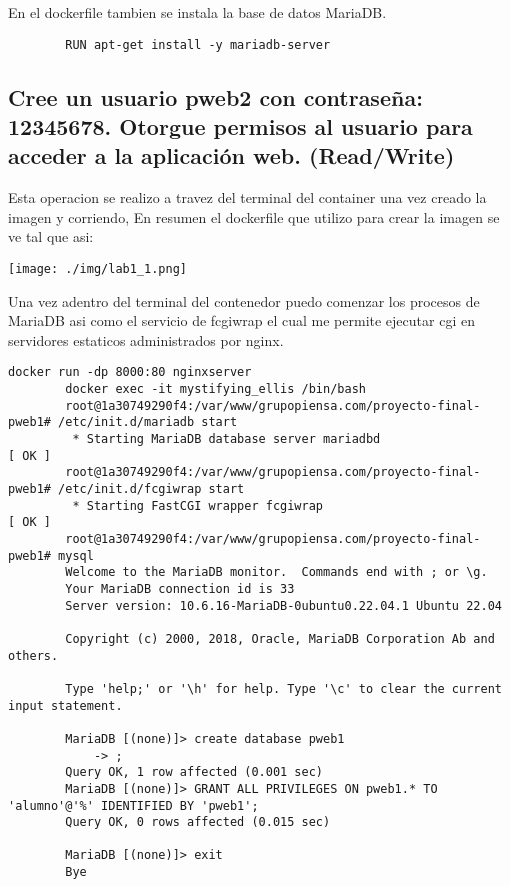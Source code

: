 \documentclass[10pt]{article}
\begin{document}
	En el dockerfile tambien se instala la base de datos MariaDB.

	\begin{lstlisting}
		RUN apt-get install -y mariadb-server
	\end{lstlisting}

	\subsection{Cree un usuario pweb2 con contraseña: 12345678. \newline
	Otorgue permisos al usuario para acceder a la aplicación web. (Read/Write) \newline}

	Esta operacion se realizo a travez del terminal del container una vez creado la imagen y corriendo,
	En resumen el dockerfile que utilizo para crear la imagen se ve tal que asi:

	\texttt{[image: ./img/lab1\_1.png]}
	
	Una vez adentro del terminal del contenedor puedo comenzar los procesos de MariaDB asi como el servicio de fcgiwrap
	el cual me permite ejecutar cgi en servidores estaticos administrados por nginx.\newline \newline

	\begin{lstlisting}[style=mybash]
		docker run -dp 8000:80 nginxserver
		docker exec -it mystifying_ellis /bin/bash
		root@1a30749290f4:/var/www/grupopiensa.com/proyecto-final-pweb1# /etc/init.d/mariadb start
		 * Starting MariaDB database server mariadbd                                                                                                                                         [ OK ] 
		root@1a30749290f4:/var/www/grupopiensa.com/proyecto-final-pweb1# /etc/init.d/fcgiwrap start
		 * Starting FastCGI wrapper fcgiwrap                                                                                                                                                 [ OK ] 
		root@1a30749290f4:/var/www/grupopiensa.com/proyecto-final-pweb1# mysql
		Welcome to the MariaDB monitor.  Commands end with ; or \g.
		Your MariaDB connection id is 33
		Server version: 10.6.16-MariaDB-0ubuntu0.22.04.1 Ubuntu 22.04

		Copyright (c) 2000, 2018, Oracle, MariaDB Corporation Ab and others.

		Type 'help;' or '\h' for help. Type '\c' to clear the current input statement.

		MariaDB [(none)]> create database pweb1
		    -> ;
		Query OK, 1 row affected (0.001 sec)		
		MariaDB [(none)]> GRANT ALL PRIVILEGES ON pweb1.* TO 'alumno'@'%' IDENTIFIED BY 'pweb1';
		Query OK, 0 rows affected (0.015 sec)

		MariaDB [(none)]> exit
		Bye

	\end{lstlisting}
\end{document}
